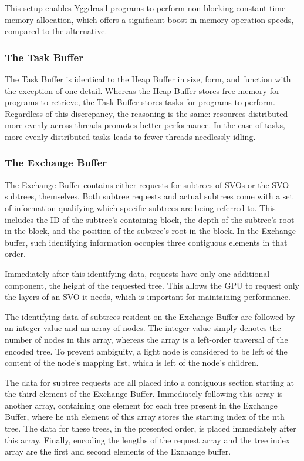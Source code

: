 \documentclass[onecolumn, draftclsnofoot,10pt, compsoc]{IEEEtran}
\begin{document}
This setup enables Yggdrasil programs to perform non-blocking constant-time memory allocation, which offers a significant boost in memory operation speeds, compared to the alternative.


\subsubsection{The Task Buffer}

The Task Buffer is identical to the Heap Buffer in size, form, and function with the exception of one detail. Whereas the Heap Buffer stores free memory for programs to retrieve, the Task Buffer stores tasks for programs to perform. Regardless of this discrepancy, the reasoning is the same: resources distributed more evenly across threads promotes better performance. In the case of tasks, more evenly distributed tasks leads to fewer threads needlessly idling.


\subsubsection{The Exchange Buffer}

The Exchange Buffer contains either requests for subtrees of SVOs or the SVO subtrees, themselves. Both subtree requests and actual subtrees come with a set of information qualifying which specific subtrees are being referred to. This includes the ID of the subtree’s containing block, the depth of the subtree’s root in the block, and the position of the subtree’s root in the block. In the Exchange buffer, such identifying information occupies three contiguous elements in that order.

Immediately after this identifying data, requests have only one additional component, the height of the requested tree. This allows the GPU to request only the layers of an SVO it needs, which is important for maintaining performance.

The identifying data of subtrees resident on the Exchange Buffer are followed by an integer value and an array of nodes. The integer value simply denotes the number of nodes in this array, whereas the array is a left-order traversal of the encoded tree. To prevent ambiguity, a light node is considered to be left of the content of the node’s mapping list, which is left of the node’s children.

The data for subtree requests are all placed into a contiguous section starting at the third element of the Exchange Buffer. Immediately following this array is another array, containing one element for each tree present in the Exchange Buffer, where he nth element of this array stores the starting index of the nth tree. The data for these trees, in the presented order, is placed immediately after this array. Finally, encoding the lengths of the request array and the tree index array are the first and second elements of the Exchange buffer.
\end{document}
